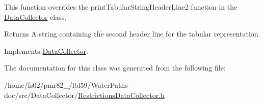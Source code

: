 This function overrides the {\ttfamily print\+Tabular\+String\+Header\+Line2} function in the {\ttfamily \mbox{\hyperlink{classDataCollector}{Data\+Collector}}} class.

\begin{DoxyReturn}{Returns}
A string containing the second header line for the tabular representation. 
\end{DoxyReturn}


Implements \mbox{\hyperlink{classDataCollector_af01ea961314be2164f39e6d4cd59e443}{Data\+Collector}}.



The documentation for this class was generated from the following file\+:\begin{DoxyCompactItemize}
\item 
/home/fs02/pmr82\+\_/lbl59/\+Water\+Paths-\/doc/src/\+Data\+Collector/\mbox{\hyperlink{RestrictionsDataCollector_8h}{Restrictions\+Data\+Collector.\+h}}\end{DoxyCompactItemize}
